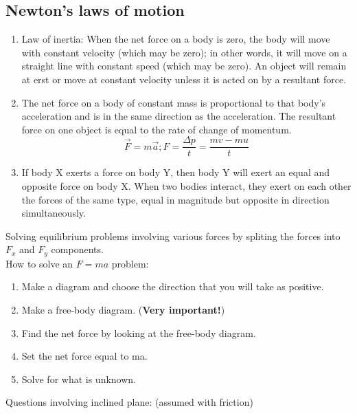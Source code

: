 \documentclass[a4paper,12pt]{article}
\begin{document}
\subsection{Newton's laws of motion}
\begin{enumerate}
  \item Law of inertia: When the net force on a body is zero, the body will move with constant velocity (which may be zero); in other words, it will move on a straight line with constant speed (which may be zero). An object will remain at erst or move at constant velocity unless it is acted on by a resultant force.
  \item The net force on a body of constant mass is proportional to that body's acceleration and is in the same direction as the acceleration. The resultant force on one object is equal to the rate of change of momentum. \[\vec{F}=m\vec{a}; F=\dfrac{\Delta p}{t}=\dfrac{mv-mu}{t}\]
  \item If body X exerts a force on body Y, then body Y will exert an equal and opposite force on body X. When two bodies interact, they exert on each other the forces of the same type, equal in magnitude but opposite in direction simultaneously.
\end{enumerate}
Solving equilibrium problems involving various forces by spliting the forces into $F_x$ and $F_y$ components.\\
How to solve an $F=ma$ problem:
\begin{enumerate}
  \item Make a diagram and choose the direction that you will take as positive. 
  \item Make a free-body diagram. (\textbf{Very important!})
  \item Find the net force by looking at the free-body diagram.
  \item Set the net force equal to ma.
  \item Solve for what is unknown.
\end{enumerate}
Questions involving inclined plane: (assumed with friction)
\end{document}
